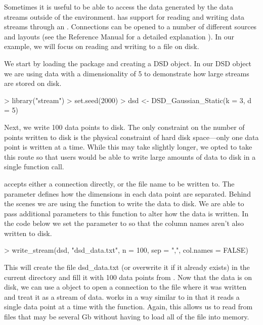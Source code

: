 \documentclass[nojss]{jss}
\begin{document}
Sometimes it is useful to be able to access the data generated by the data streams outside of the  environment.  has support for reading and writing data streams through an  . Connections can be opened to a number of different sources and layouts (see the  Reference Manual for a detailed explanation \citep{stream:R:2005}). In our example, we will focus on reading and writing to a file on disk.

We start by loading the package and creating a DSD object. In our DSD object we are using data with a dimensionality of 5 to demonstrate how large streams are stored on disk.

\begin{Schunk}
\begin{Sinput}
> library("stream")
> set.seed(2000)
> dsd <- DSD_Gaussian_Static(k = 3, d = 5)
\end{Sinput}
\end{Schunk}

Next, we write 100 data points to disk. The only constraint on the number of points written to disk is the physical constraint of hard disk space---only one data point is written at a time. While this may take slightly longer, we opted to take this route so that users would be able to write large amounts of data to disk in a single function call.

 accepts either a connection directly, or the file name to be written to. The  parameter defines how the dimensions in each data point are separated. Behind the scenes we are using the  function to write the data to disk. We are able to pass additional parameters to this function to alter how the data is written. In the code below we set the  parameter to  so that the column names aren't also written to disk.

\begin{Schunk}
\begin{Sinput}
> write_stream(dsd, "dsd_data.txt", n = 100, sep = ",", col.names = FALSE)
\end{Sinput}
\end{Schunk}

This will create the file dsd\_data.txt (or overwrite it if it already exists) in the current directory and fill it with 100 data points from . Now that the data is on disk, we can use a  object to open a connection to the file where it was written and treat it as a stream of data.  works in a way similar to  in that it reads a single data point at a time with the  function. Again, this allows us to read from files that may be several Gb without having to load all of the file into memory.
\end{document}
